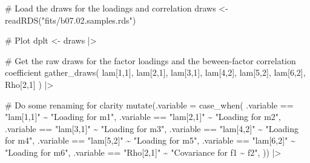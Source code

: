 \documentclass[
  letterpaper,
  DIV=11,
  numbers=noendperiod]{scrreprt}
\newenvironment{Shaded}{\begin{snugshade}}{\end{snugshade}}
\newcommand{\AttributeTok}[1]{\textcolor[rgb]{0.40,0.45,0.13}{#1}}
\newcommand{\CommentTok}[1]{\textcolor[rgb]{0.37,0.37,0.37}{#1}}
\newcommand{\FunctionTok}[1]{\textcolor[rgb]{0.28,0.35,0.67}{#1}}
\newcommand{\NormalTok}[1]{\textcolor[rgb]{0.00,0.23,0.31}{#1}}
\newcommand{\OtherTok}[1]{\textcolor[rgb]{0.00,0.23,0.31}{#1}}
\newcommand{\SpecialCharTok}[1]{\textcolor[rgb]{0.37,0.37,0.37}{#1}}
\newcommand{\StringTok}[1]{\textcolor[rgb]{0.13,0.47,0.30}{#1}}
\begin{document}
\begin{Shaded}
\begin{Highlighting}[]
\CommentTok{\# Load the draws for the loadings and correlation }
\NormalTok{draws }\OtherTok{\textless{}{-}} \FunctionTok{readRDS}\NormalTok{(}\StringTok{"fits/b07.02.samples.rds"}\NormalTok{)}

\CommentTok{\# Plot}
\NormalTok{dplt }\OtherTok{\textless{}{-}}\NormalTok{ draws }\SpecialCharTok{|\textgreater{}}

  \CommentTok{\# Get the raw draws for the factor loadings and the beween{-}factor correlation coefficient}
  \FunctionTok{gather\_draws}\NormalTok{(}
    \StringTok{\textasciigrave{}}\AttributeTok{lam[1,1]}\StringTok{\textasciigrave{}}\NormalTok{,}
    \StringTok{\textasciigrave{}}\AttributeTok{lam[2,1]}\StringTok{\textasciigrave{}}\NormalTok{,}
    \StringTok{\textasciigrave{}}\AttributeTok{lam[3,1]}\StringTok{\textasciigrave{}}\NormalTok{,}
    \StringTok{\textasciigrave{}}\AttributeTok{lam[4,2]}\StringTok{\textasciigrave{}}\NormalTok{,}
    \StringTok{\textasciigrave{}}\AttributeTok{lam[5,2]}\StringTok{\textasciigrave{}}\NormalTok{,}
    \StringTok{\textasciigrave{}}\AttributeTok{lam[6,2]}\StringTok{\textasciigrave{}}\NormalTok{,}
    \StringTok{\textasciigrave{}}\AttributeTok{Rho[2,1]}\StringTok{\textasciigrave{}}
\NormalTok{  ) }\SpecialCharTok{|\textgreater{}}

  \CommentTok{\# Do some renaming for clarity}
  \FunctionTok{mutate}\NormalTok{(}\AttributeTok{.variable =} \FunctionTok{case\_when}\NormalTok{(}
\NormalTok{    .variable }\SpecialCharTok{==} \StringTok{"lam[1,1]"} \SpecialCharTok{\textasciitilde{}} \StringTok{"Loading for m1"}\NormalTok{,}
\NormalTok{    .variable }\SpecialCharTok{==} \StringTok{"lam[2,1]"} \SpecialCharTok{\textasciitilde{}} \StringTok{"Loading for m2"}\NormalTok{,}
\NormalTok{    .variable }\SpecialCharTok{==} \StringTok{"lam[3,1]"} \SpecialCharTok{\textasciitilde{}} \StringTok{"Loading for m3"}\NormalTok{,}
\NormalTok{    .variable }\SpecialCharTok{==} \StringTok{"lam[4,2]"} \SpecialCharTok{\textasciitilde{}} \StringTok{"Loading for m4"}\NormalTok{,}
\NormalTok{    .variable }\SpecialCharTok{==} \StringTok{"lam[5,2]"} \SpecialCharTok{\textasciitilde{}} \StringTok{"Loading for m5"}\NormalTok{,}
\NormalTok{    .variable }\SpecialCharTok{==} \StringTok{"lam[6,2]"} \SpecialCharTok{\textasciitilde{}} \StringTok{"Loading for m6"}\NormalTok{,}
\NormalTok{    .variable }\SpecialCharTok{==} \StringTok{"Rho[2,1]"} \SpecialCharTok{\textasciitilde{}} \StringTok{"Covariance for f1 \textasciitilde{} f2"}\NormalTok{,}
\NormalTok{  )) }\SpecialCharTok{|\textgreater{}}


\end{Highlighting}
\end{Shaded}
\end{document}
